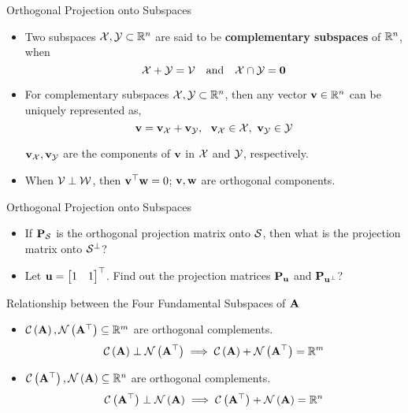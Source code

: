 \documentclass[aspectratio=169]{beamer}
\let\olditem\item
\renewcommand{\item}{\setlength{\itemsep}{\fill}\olditem}
\def\mf{\ensuremath\mathbf}
\def\mb{\ensuremath\mathbb}
\def\mc{\ensuremath\mathcal}
\def\lp{\ensuremath\left(}
\def\rp{\ensuremath\right)}
\def\bmx{\ensuremath\begin{bmatrix*}[r]}
\def\emx{\ensuremath\end{bmatrix*}}
\begin{document}
\begin{frame}[t]{Orthogonal Projection onto Subspaces}
\begin{itemize}
    \item Two subspaces $\mc{X}, \mc{Y} \subset \mb{R}^n$ are said to be \textbf{complementary subspaces} of $\mb{R}^n$, when
    \[ \mc{X} + \mc{Y} = \mc{V} \quad \text{and} \quad \mc{X}\cap\mc{Y} = \mf{0} \] 

    \item For complementary subspaces $\mc{X}, \mc{Y} \subset \mb{R}^n$, then any vector $\mf{v} \in \mb{R}^n$ can be uniquely represented as,
    \[ \mf{v} = \mf{v}_{\mc{X}} + \mf{v}_{\mc{Y}},  \,\,\ \mf{v}_\mc{X} \in \mc{X}, \,\, \mf{v}_\mc{Y} \in \mc{Y} \] 

    $\mf{v}_\mc{X}, \mf{v}_\mc{Y}$ are the components of $\mf{v}$ in $\mc{X}$ and $\mc{Y}$, respectively.

    \item When $\mc{V} \perp \mc{W}$, then $\mf{v}^\top\mf{w} = 0$; $\mf{v}, \mf{w}$ are orthogonal components. 
\end{itemize}
\end{frame}



\begin{frame}[t]{Orthogonal Projection onto Subspaces}
\begin{itemize}
    \item If $\mf{P}_\mc{S}$ is the orthogonal projection matrix onto $\mc{S}$, then what is the projection matrix onto $\mc{S}^\perp$?

    \item {\color{blue} Let $\mf{u} = \bmx 1 & 1 \emx^\top$. Find out the projection matrices $\mf{P}_\mf{u}$ and $\mf{P}_{\mf{u}^\perp}$?}
\end{itemize}
\end{frame}


\begin{frame}[t]{Relationship between the Four Fundamental Subspaces of $\mf{A}$}
\begin{itemize}
    \item $\mc{C}\lp\mf{A}\rp, \mc{N}\lp\mf{A}^\top\rp \subseteq \mb{R}^m$ are orthogonal complements.
    $$\mc{C}\lp\mf{A}\rp \perp \mc{N}\lp\mf{A}^\top\rp \implies \mc{C}\lp\mf{A}\rp + \mc{N}\lp\mf{A}^\top\rp = \mb{R}^m$$

    \item $\mc{C}\lp\mf{A}^\top\rp, \mc{N}\lp\mf{A}\rp \subseteq \mb{R}^n$ are orthogonal complements.
    $$\mc{C}\lp\mf{A}^\top\rp \perp \mc{N}\lp\mf{A}\rp \implies \mc{C}\lp\mf{A}^\top\rp + \mc{N}\lp\mf{A}\rp = \mb{R}^n$$
\end{itemize}
\end{frame}
\end{document}
